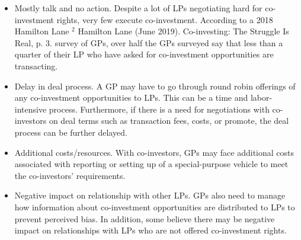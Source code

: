 \documentclass[11pt]{article}
\begin{document}
\begin{itemize}
  \item Mostly talk and no action. Despite a lot of LPs negotiating hard for co-investment rights, very few execute co-investment. According to a 2018 Hamilton Lane $^{2}$ Hamilton Lane (June 2019). Co-investing: The Struggle Is Real, p. 3. survey of GPs, over half the GPs surveyed say that less than a quarter of their LP who have asked for co-investment opportunities are transacting.
  \item Delay in deal process. A GP may have to go through round robin offerings of any co-investment opportunities to LPs. This can be a time and labor-intensive process. Furthermore, if there is a need for negotiations with co-investors on deal terms such as transaction fees, costs, or promote, the deal process can be further delayed.
  \item Additional costs/resources. With co-investors, GPs may face additional costs associated with reporting or setting up of a special-purpose vehicle to meet the co-investors' requirements.
  \item Negative impact on relationship with other LPs. GPs also need to manage how information about co-investment opportunities are distributed to LPs to prevent perceived bias. In addition, some believe there may be negative impact on relationships with LPs who are not offered co-investment rights.
\end{itemize}
\end{document}
